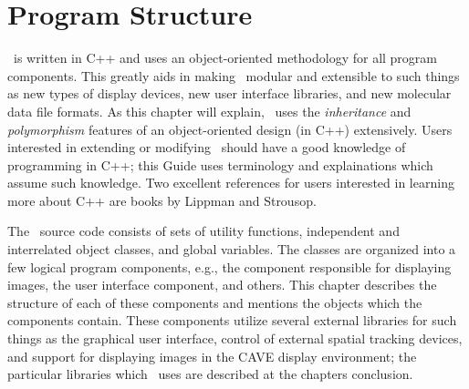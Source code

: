 
%
%
%

\chapter{Program Structure}
\label{chapter:pg:struct}

\VMD\ is written in C++ and uses an object-oriented methodology for
all program components.  This greatly aids in making \VMD\ modular
and extensible to such things as new types of display devices, new
user interface libraries, and new molecular data file formats.  As
this chapter will explain, \VMD\ uses the {\em inheritance} and {\em
polymorphism} features of an object-oriented design (in
C++) extensively.  Users interested in extending or modifying \VMD\
should have a good knowledge of programming in C++; this Guide uses
terminology and explainations which assume such knowledge.  Two
excellent references for users interested in learning more about C++
are books by Lippman\mycite{}{} and Strousop\mycite{}{}.

The \VMD\ source code consists of sets of utility functions,
independent and interrelated object classes, and global variables. 
The classes are organized into a few logical program components,
e.g., the component responsible for displaying images, the user
interface component, and others.  This chapter describes the
structure of each of these components and mentions the objects which
the components contain.  These components utilize several external
libraries for such things as the graphical user interface, control of
external spatial tracking devices, and support for displaying images
in the CAVE display environment\mycite{}{}; the particular libraries
which \VMD\ uses are described at the chapters conclusion.


